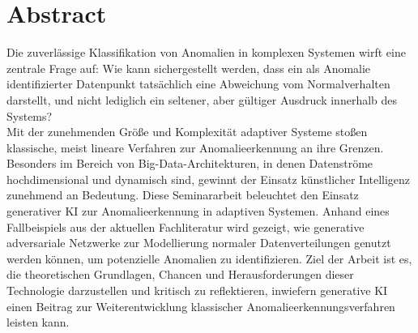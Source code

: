 \setcounter{page}{2}
\chapter*{Abstract}
\label{chapter:abstract}
Die zuverlässige Klassifikation von Anomalien in komplexen Systemen wirft eine zentrale Frage auf: Wie kann sichergestellt werden, dass ein als Anomalie identifizierter Datenpunkt tatsächlich eine Abweichung vom Normalverhalten darstellt, und nicht lediglich ein seltener, aber gültiger Ausdruck innerhalb des Systems? \\
Mit der zunehmenden Größe und Komplexität adaptiver Systeme stoßen klassische, meist lineare Verfahren zur Anomalieerkennung an ihre Grenzen. Besonders im Bereich von Big-Data-Architekturen, in denen Datenströme hochdimensional und dynamisch sind, gewinnt der Einsatz künstlicher Intelligenz zunehmend an Bedeutung.
Diese Seminararbeit beleuchtet den Einsatz generativer KI zur Anomalieerkennung in adaptiven Systemen. Anhand eines Fallbeispiels aus der aktuellen Fachliteratur wird gezeigt, wie generative adversariale Netzwerke zur Modellierung normaler Datenverteilungen genutzt werden können, um potenzielle Anomalien zu identifizieren. Ziel der Arbeit ist es, die theoretischen Grundlagen, Chancen und Herausforderungen dieser Technologie darzustellen und kritisch zu reflektieren, inwiefern generative KI einen Beitrag zur Weiterentwicklung klassischer Anomalieerkennungsverfahren leisten kann.
